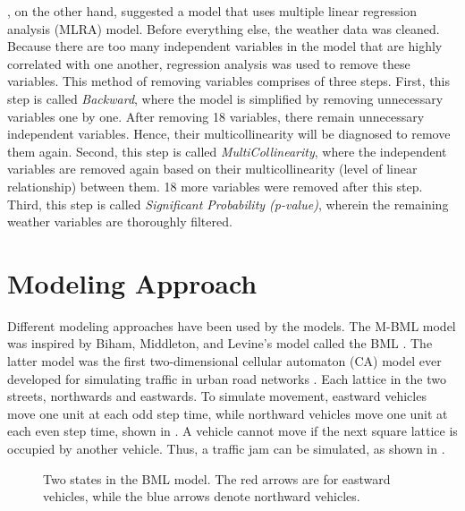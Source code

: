 , on the other hand, suggested a model that uses multiple linear regression analysis (MLRA) model. Before everything else, the weather data was cleaned. Because there are too many independent variables in the model that are highly correlated with one another, regression analysis was used to remove these variables. This method of removing variables comprises of three steps. First, this step is called \textit{Backward}, where the model is simplified by removing unnecessary variables one by one. After removing 18 variables, there remain unnecessary independent variables. Hence, their multicollinearity will be diagnosed to remove them again. Second, this step is called \textit{MultiCollinearity}, where the independent variables are removed again based on their multicollinearity (level of linear relationship) between them. 18 more variables were removed after this step. Third, this step is called \textit{Significant Probability (p-value)}, wherein the remaining weather variables are thoroughly filtered.





\section{Modeling Approach}
Different modeling approaches have been used by the models. The M-BML model was inspired by Biham, Middleton, and Levine’s model called the BML . The latter model was the first two-dimensional cellular automaton (CA) model ever developed for simulating traffic in urban road networks . Each lattice in the two streets, northwards and eastwards. To simulate movement, eastward vehicles move one unit at each odd step time, while northward vehicles move one unit at each even step time, shown in . A vehicle cannot move if the next square lattice is occupied by another vehicle. Thus, a traffic jam can be simulated, as shown in . 

\begin{figure}[h]
  	\centering
    	\captionsetup{justification=centering}
  	\hfill
  	\caption{Two states in the BML model. The red arrows are for eastward vehicles, while the blue arrows denote northward vehicles.}
\end{figure}


